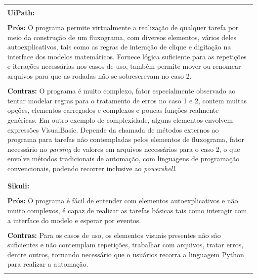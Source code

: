 \documentclass[tg]{mdtufsm}
\begin{document}
        		{\centering
                    \begin{tabular}{ | m{15.6cm} | }
            		    \hline \\
                		{\bf UiPath:} \\ \\
                		{\bf Prós:}
                            O programa permite virtualmente a realização de qualquer tarefa por meio da construção de um fluxograma, com diversos elementos, vários deles autoexplicativos, tais como as regras de interação de clique e digitação na interface dos modelos matemáticos. Fornece lógica suficiente para as repetições e iterações necessárias nos casos de uso, também permite mover ou renomear arquivos para que as rodadas não se sobrescrevam no caso 2. \\ \\
                		{\bf Contras:}
                            O programa é muito complexo, fator especialmente observado ao tentar modelar regras para o tratamento de erros no caso 1 e 2, contem muitas opções, elementos carregados e complexos e poucas funções realmente genéricas. Em outro exemplo de complexidade, alguns elementos envolvem expressões VisualBasic.
                            Depende da chamada de métodos externos ao programa para tarefas não contempladas pelos elementos de fluxograma, fator necessário no \emph{parsing} de valores em arquivos necessários para o caso 2, o que envolve métodos tradicionais de automação, com linguagens de programação convencionais, podendo recorrer inclusive ao \emph{powershell}. \\ \\
                		\hline

                        \hline \\
                        {\bf Sikuli:} \\ \\
                		{\bf Prós:}
                            O programa é fácil de entender com elementos autoexplicativos e não muito complexos, é capaz de realizar as tarefas básicas tais como interagir com a interface do modelo e esperar por eventos. \\ \\
                		{\bf Contras:}
                            Para os casos de uso, os elementos visuais presentes não são suficientes e não contemplam repetições, trabalhar com arquivos, tratar erros, dentre outros, tornando necessário que o usuários recorra a linguagem Python para realizar a automação. \\ \\
            		    \hline
                    \end{tabular} \\

}
\end{document}
